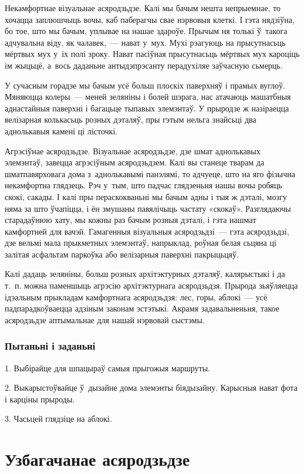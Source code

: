 Некамфортнае візуальнае асяродзьдзе. Калі мы бачым нешта непрыемнае, то хочацца заплюшчыць вочы, каб паберагчы свае нэрвовыя клеткі. І гэта нядзіўна, бо тое, што мы бачым, уплывае на нашае здароўе. Прычым ня толькі ў~такога адчувальна віду, як чалавек,~--- нават у~мух. Мухі рэагуюць на прысутнасьць мёртвых мух у~іх полі зроку. Нават пасіўная прысутнасьць мёртвых мух кароціць ім жыцьцё, а~вось даданьне антыдэпрэсанту перадухіляе заўчасную сьмерць.

У сучасным горадзе мы бачым усё больш плоскіх паверхняў і прамых вуглоў. Мяняюцца колеры~--- меней зеляніны і болей шэрага, нас атачаюць машатбныя аднастайныя паверхні і багацьце тыпавых элемэнтаў. У прыродзе ж назіраецца велізарная колькасьць розных дэталяў, пры гэтым нельга знайсьці два аднолькавыя камені ці лісточкі.

Агрэсіўнае асяродзьдзе. Візуальнае асяродзьдзе, дзе шмат аднолькавых элемэнтаў, завецца агрэсіўным асяродзьдзем. Калі вы станеце тварам да шматпавярховага дома з~аднолькавымі панэлямі, то адчуеце, што на яго фізычна некамфортна глядзець. Рэч у~тым, што падчас глядзеньня нашы вочы робяць скокі, сакады. І калі пры пераскокваньні мы бачым адны і тыя ж дэталі, мозгу няма за што ўчапіцца, і ён змушаны павялічыць частату «скокаў». Разглядаючы старадаўнюю хату, мы кожны раз бачым розныя дэталі, і гэта нашмат камфортней для вачэй. Гамагенныя візуальныя асяродзьдзі~--- гэта асяродзьдзі, дзе вельмі мала прыкметных элемэнтаў, напрыклад, роўная белая сьцяна ці залітая асфальтам паркоўка або велізарныя паверхні пакрыцьцяў.

Калі дадаць зеляніны, больш розных архітэктурных дэталяў, калярыстыкі і да т.~п. можна паменшыць агрэсію архітэктурнага асяродзьдзя. Прырода зьяўляецца ідэальным прыкладам камфортнага асяродзьдзя: лес, горы, аблокі~--- усё падпарадкоўваецца адзіным законам эстэтыкі. Акрамя задавальненьня, такое асяродзьдзе аптымальнае для нашай нэрвовай сыстэмы.

\subsubsection{Пытаньні і заданьні}

1. Выбірайце для шпацыраў самыя прыгожыя маршруты.

2. Выкарыстоўвайце ў~дызайне дома элемэнты біядызайну. Карысныя нават фота і карціны прыроды.

3. Часьцей глядзіце на аблокі.


\section{Узбагачанае асяродзьдзе}


